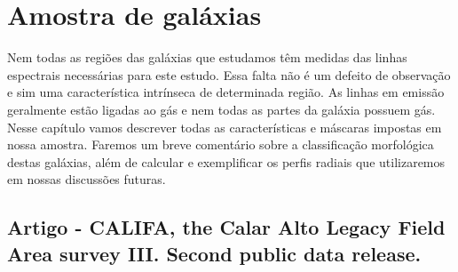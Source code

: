 


\chapter{Amostra de galáxias}
\label{sec:amostra}

Nem todas as regiões das galáxias que estudamos têm medidas das linhas espectrais necessárias para
este estudo. Essa falta não é um defeito de observação e sim uma característica intrínseca de
determinada região. As linhas em emissão geralmente estão ligadas ao gás e nem todas as partes da
galáxia possuem gás. Nesse capítulo vamos descrever todas as características e máscaras impostas em
nossa amostra. Faremos um breve comentário sobre a classificação morfológica destas galáxias, além
de calcular e exemplificar os perfis radiais que utilizaremos em nossas discussões futuras.

\section{Artigo - CALIFA, the Calar Alto Legacy Field Area survey III. Second public data
release.}

